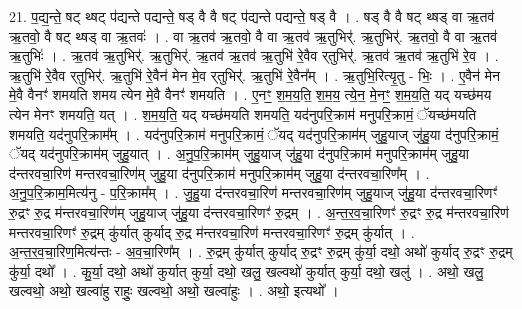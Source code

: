 \documentclass[17pt]{extarticle}
\begin{document}
21. प॒द्य॒न्ते॒ षट् थ्षट् प॑द्यन्ते पद्यन्ते॒ षड् वै वै षट् प॑द्यन्ते पद्यन्ते॒ षड् वै । . षड् वै वै षट् थ्षड् वा ऋ॒तव॑ ऋ॒तवो॒ वै षट् थ्षड् वा ऋ॒तवः॑ । . वा ऋ॒तव॑ ऋ॒तवो॒ वै वा ऋ॒तव॑ ऋ॒तुभिर्॑. ऋ॒तुभिर्॑. ऋ॒तवो॒ वै वा ऋ॒तव॑ ऋ॒तुभिः॑ । . ऋ॒तव॑ ऋ॒तुभिर्॑. ऋ॒तुभिर्॑. ऋ॒तव॑ ऋ॒तव॑ ऋ॒तुभि॑ रे॒वैव र्‌तुभिर्॑. ऋ॒तव॑ ऋ॒तव॑ ऋ॒तुभि॑ रे॒व । . ऋ॒तुभि॑ रे॒वैव र्‌तुभिर्॑. ऋ॒तुभि॑ रे॒वैन॑ मेन मे॒व र्‌तुभिर्॑. ऋ॒तुभि॑ रे॒वैन᳚म् । . ऋ॒तुभि॒रित्यृ॒तु - भिः॒ । . ए॒वैन॑ मेन मे॒वै वैनꣳ॑ शमयति शमय त्येन मे॒वै वैनꣳ॑ शमयति । . ए॒नꣳ॒॒ श॒म॒य॒ति॒ श॒म॒य॒ त्ये॒न॒ मे॒नꣳ॒॒ श॒म॒य॒ति॒ यद् यच्छ॑मय त्येन मेनꣳ शमयति॒ यत् । . श॒म॒य॒ति॒ यद् यच्छ॑मयति शमयति॒ यद॑नुपरि॒क्राम॑ मनुपरि॒क्रामं॒ ॅयच्छ॑मयति शमयति॒ यद॑नुपरि॒क्राम᳚म् । . यद॑नुपरि॒क्राम॑ मनुपरि॒क्रामं॒ ॅयद् यद॑नुपरि॒क्राम॑म् जुहु॒याज् जु॑हु॒या द॑नुपरि॒क्रामं॒ ॅयद् यद॑नुपरि॒क्राम॑म् जुहु॒यात् । . अ॒नु॒प॒रि॒क्राम॑म् जुहु॒याज् जु॑हु॒या द॑नुपरि॒क्राम॑ मनुपरि॒क्राम॑म् जुहु॒या द॑न्तरवचा॒रिण॑ मन्तरवचा॒रिण॑म् जुहु॒या द॑नुपरि॒क्राम॑ मनुपरि॒क्राम॑म् जुहु॒या द॑न्तरवचा॒रिण᳚म् । . अ॒नु॒प॒रि॒क्राम॒मित्य॑नु - प॒रि॒क्राम᳚म् । . जु॒हु॒या द॑न्तरवचा॒रिण॑ मन्तरवचा॒रिण॑म् जुहु॒याज् जु॑हु॒या द॑न्तरवचा॒रिणꣳ॑ रु॒द्रꣳ रु॒द्र म॑न्तरवचा॒रिण॑म् जुहु॒याज् जु॑हु॒या द॑न्तरवचा॒रिणꣳ॑ रु॒द्रम् । . अ॒न्त॒र॒व॒चा॒रिणꣳ॑ रु॒द्रꣳ रु॒द्र म॑न्तरवचा॒रिण॑ मन्तरवचा॒रिणꣳ॑ रु॒द्रम् कु॑र्यात् कुर्याद् रु॒द्र म॑न्तरवचा॒रिण॑ मन्तरवचा॒रिणꣳ॑ रु॒द्रम् कु॑र्यात् । . अ॒न्त॒र॒व॒चा॒रिण॒मित्य॑न्तः - अ॒व॒चा॒रिण᳚म् । . रु॒द्रम् कु॑र्यात् कुर्याद् रु॒द्रꣳ रु॒द्रम् कु॑र्या॒ दथो॒ अथो॑ कुर्याद् रु॒द्रꣳ रु॒द्रम् कु॑र्या॒ दथो᳚ । . कु॒र्या॒ दथो॒ अथो॑ कुर्यात् कुर्या॒ दथो॒ खलु॒ खल्वथो॑ कुर्यात् कुर्या॒ दथो॒ खलु॑ । . अथो॒ खलु॒ खल्वथो॒ अथो॒ खल्वा॑हु राहुः॒ खल्वथो॒ अथो॒ खल्वा॑हुः । . अथो॒ इत्यथो᳚ । \newline
\end{document}

